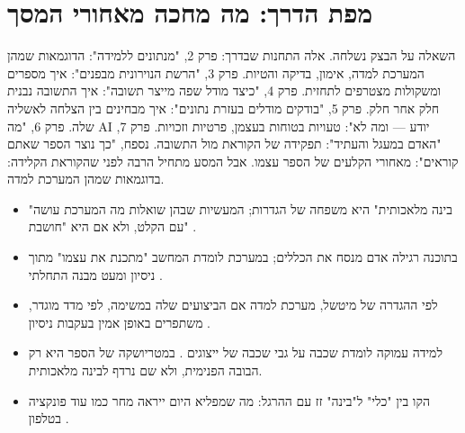\section{מפת הדרך: מה מחכה מאחורי המסך}
השאלה על הבצק נשלחה. אלה התחנות שבדרך: פרק 2, "מנתונים ללמידה": הדוגמאות שמהן המערכת למדה, אימון, בדיקה והטיות. פרק 3, "הרשת הנוירונית מבפנים": איך מספרים ומשקולות מצטרפים לתחזית. פרק 4, "כיצד מודל שפה מייצר תשובה": איך התשובה נבנית חלק אחר חלק. פרק 5, "בודקים מודלים בעזרת נתונים": איך מבחינים בין הצלחה לאשליה שלה. פרק 6, "מה AI יודע — ומה לא": טעויות בטוחות בעצמן, פרטיות וזכויות. פרק 7, "האדם במעגל והעתיד": תפקידה של הקוראת מול התשובה. נספח, "כך נוצר הספר שאתם קוראים": מאחורי הקלעים של הספר עצמו.
אבל המסע מתחיל הרבה לפני שהקוראת הקלידה: בדוגמאות שמהן המערכת למדה.
\begin{insightsbox}
\begin{itemize}
\item "בינה מלאכותית" היא משפחה של הגדרות; המעשיות שבהן שואלות מה המערכת עושה עם הקלט, ולא אם היא "חושבת" \cite{S-ch01-07,S-ch01-09}.
\item בתוכנה רגילה אדם מנסח את הכללים; במערכת לומדת המחשב "מתכנת את עצמו" מתוך ניסיון ומעט מבנה התחלתי \cite{S-ch01-03}.
\item לפי ההגדרה של מיטשל, מערכת למדה אם הביצועים שלה במשימה, לפי מדד מוגדר, משתפרים באופן אמין בעקבות ניסיון \cite{S-ch01-03}.
\item למידה עמוקה לומדת שכבה על גבי שכבה של ייצוגים \cite{S-ch01-05}. במטריושקה של הספר היא רק הבובה הפנימית, ולא שם נרדף לבינה מלאכותית.
\item הקו בין "כלי" ל"בינה" זז עם ההרגל: מה שמפליא היום ייראה מחר כמו עוד פונקציה בטלפון \cite{S-ch01-07}.
\end{itemize}
\end{insightsbox}
